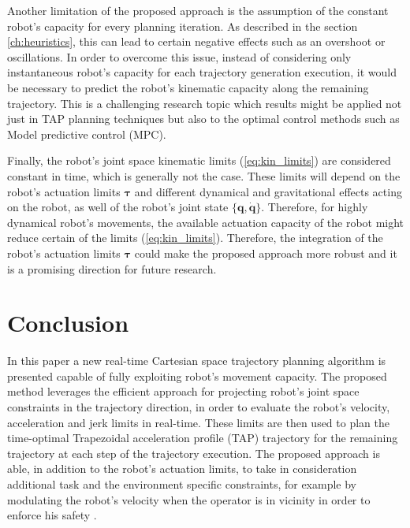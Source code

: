 Another limitation of the proposed approach is the assumption of the constant robot's capacity for every planning iteration. As described in the section \ref{ch:heuristics}, this can lead to certain negative effects such as an overshoot or oscillations.  In order to overcome this issue, instead of considering only instantaneous robot's capacity for each trajectory generation execution, it would be necessary to predict the robot's kinematic capacity along the remaining trajectory. This is a challenging research topic which results might be applied not just in TAP planning techniques but also to the optimal control methods such as Model predictive control (MPC).  

Finally, the robot's joint space kinematic limits (\ref{eq:kin_limits}) are considered constant in time, which is generally not the case.
These limits will depend on the robot's actuation limits $\bm{\tau}$ and different dynamical and gravitational effects acting on the robot, as well of the robot's joint state $\{\bm{q},\dot{\bm{q}}\}$. Therefore, for highly dynamical robot's movements, the available actuation capacity of the robot might reduce certain of the limits (\ref{eq:kin_limits}). Therefore, the integration of the robot's actuation limits $\bm{\tau}$ could make the proposed approach more robust and it is a promising direction for future research. 


\section{Conclusion}


In this paper a new real-time Cartesian space trajectory planning algorithm is presented capable of fully exploiting robot's movement capacity. The proposed method leverages the efficient approach for projecting robot's joint space constraints in the trajectory direction, in order to evaluate the robot's velocity, acceleration and jerk limits in real-time. These limits are then used to plan the time-optimal Trapezoidal acceleration profile (TAP) trajectory for the remaining trajectory at each step of the trajectory execution. The proposed approach is able, in addition to the robot's actuation limits, to take in consideration additional task and the environment specific constraints, for example by modulating the robot's velocity when the operator is in vicinity in order to enforce his safety \cite{smu}.


